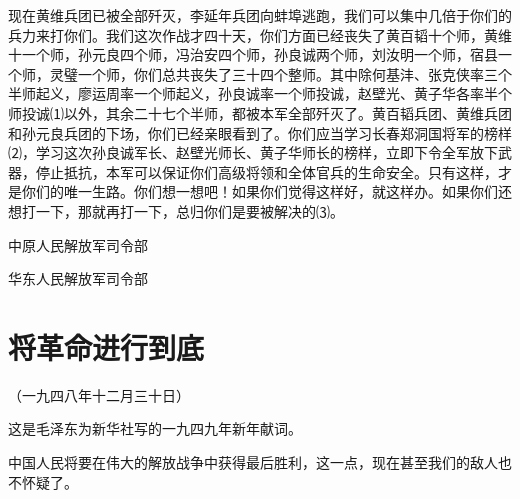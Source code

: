\documentclass[UTF-8, a5paper, 12pt]{ctexart}
\begin{document}
现在黄维兵团已被全部歼灭，李延年兵团向蚌埠逃跑，我们可以集中几倍于你们的兵力来打你们。我们这次作战才四十天，你们方面已经丧失了黄百韬十个师，黄维十一个师，孙元良四个师，冯治安四个师，孙良诚两个师，刘汝明一个师，宿县一个师，灵璧一个师，你们总共丧失了三十四个整师。其中除何基沣、张克侠率三个半师起义，廖运周率一个师起义，孙良诚率一个师投诚，赵壁光、黄子华各率半个师投诚⑴以外，其余二十七个半师，都被本军全部歼灭了。黄百韬兵团、黄维兵团和孙元良兵团的下场，你们已经亲眼看到了。你们应当学习长春郑洞国将军的榜样⑵，学习这次孙良诚军长、赵壁光师长、黄子华师长的榜样，立即下令全军放下武器，停止抵抗，本军可以保证你们高级将领和全体官兵的生命安全。只有这样，才是你们的唯一生路。你们想一想吧！如果你们觉得这样好，就这样办。如果你们还想打一下，那就再打一下，总归你们是要被解决的⑶。

中原人民解放军司令部

华东人民解放军司令部

\section{将革命进行到底}

（一九四八年十二月三十日）

这是毛泽东为新华社写的一九四九年新年献词。

中国人民将要在伟大的解放战争中获得最后胜利，这一点，现在甚至我们的敌人也不怀疑了。
\end{document}
